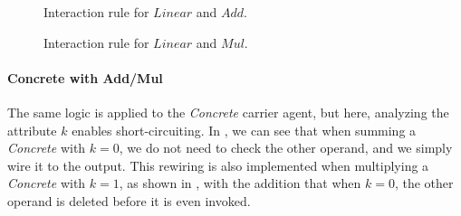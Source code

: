 \begin{figure}[H]
	\centering
	\caption{Interaction rule for $\mathit{Linear}$ and $\mathit{Add}$.}
	\label{fig:rule-linear-add}
\end{figure}

\begin{figure}[H]
	\centering
	\caption{Interaction rule for $\mathit{Linear}$ and $\mathit{Mul}$.}
	\label{fig:rule-linear-mul}
\end{figure}

\paragraph{Concrete with Add/Mul}
The same logic is applied to the \textit{Concrete} carrier agent, but here, analyzing the attribute $k$
enables short-circuiting. In \textbf{}, we can see that when summing a \textit{Concrete}
with $k=0$, we do not need to check the other operand, and we simply wire it to the output.
This rewiring is also implemented when multiplying a \textit{Concrete} with $k=1$, as shown in
\textbf{}, with the addition that when $k=0$, the other operand is deleted
before it is even invoked.

